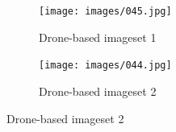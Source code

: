 \begin{figure}
  \begin{subfigure}[b]{0.4\textwidth}
    \texttt{[image: images/045.jpg]}
    \caption{Drone-based imageset 1}
    \label{fig:1}
  \end{subfigure}
  \begin{subfigure}[b]{0.4\textwidth}
    \texttt{[image: images/044.jpg]}
    \caption{Drone-based imageset 2}
    \label{fig:2}
  \end{subfigure}
\end{figure}